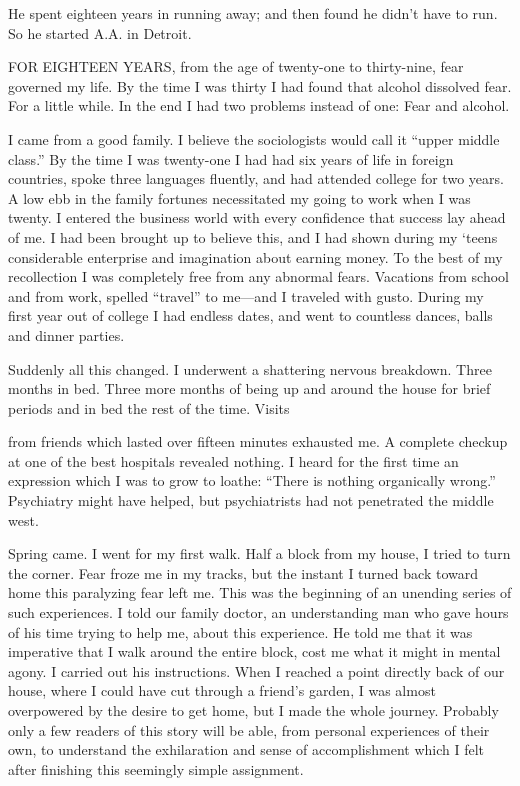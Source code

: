 
\bbChapterPreamble


\begin{biblechapter}
    He spent eighteen years in running away; 
    and then found he didn’t have to run.
\verse So he started A.A. in Detroit.
\end{biblechapter}


\begin{biblechapter}
    FOR EIGHTEEN YEARS, from the age of twenty-one to thirty-nine, fear governed my life. By the time I was thirty I had found that alcohol dissolved fear. For a little while. In the end I had two problems instead of one: Fear and alcohol.

I came from a good family. I believe the sociologists would call it “upper middle class.” By the time I was twenty-one I had had six years of life in foreign countries, spoke three languages fluently, and had attended college for two years. A low ebb in the family fortunes necessitated my going to work when I was twenty. I entered the business world with every confidence that success lay ahead of me. I had been brought up to believe this, and I had shown during my ‘teens considerable enterprise and imagination about earning money. To the best of my recollection I was completely free from any abnormal fears. Vacations from school and from work, spelled “travel” to me—and I traveled with gusto. During my first year out of college I had endless dates, and went to countless dances, balls and dinner parties.

Suddenly all this changed. I underwent a shattering nervous breakdown. Three months in bed. Three more months of being up and around the house for brief periods and in bed the rest of the time. Visits

from friends which lasted over fifteen minutes exhausted me. A complete checkup at one of the best hospitals revealed nothing. I heard for the first time an expression which I was to grow to loathe: “There is nothing organically wrong.” Psychiatry might have helped, but psychiatrists had not penetrated the middle west.

Spring came. I went for my first walk. Half a block from my house, I tried to turn the corner. Fear froze me in my tracks, but the instant I turned back toward home this paralyzing fear left me. This was the beginning of an unending series of such experiences. I told our family doctor, an understanding man who gave hours of his time trying to help me, about this experience. He told me that it was imperative that I walk around the entire block, cost me what it might in mental agony. I carried out his instructions. When I reached a point directly back of our house, where I could have cut through a friend’s garden, I was almost overpowered by the desire to get home, but I made the whole journey. Probably only a few readers of this story will be able, from personal experiences of their own, to understand the exhilaration and sense of accomplishment which I felt after finishing this seemingly simple assignment.


\end{biblechapter}
